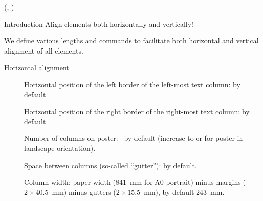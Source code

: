 \documentclass{beamer}
\newlength{\blockThree}
\begin{document}
\begin{frame}[t]
\begin{textblock*}{\colwidth}
\end{textblock*}







\TPshowboxesfalse

\begin{textblock*}{\colwidth}(\leftmargin, \blockThree)

\begin{parblock}{Introduction}
	\alert{Align elements both horizontally and vertically!}

	\vspace{0.333333\baselineskip}
	\noindent We define various lengths and commands to facilitate both horizontal and vertical alignment of all elements.

	\vspace{0.666667\baselineskip}
	\noindent\alert{Horizontal alignment}

	\begin{description}
		\item[] Horizontal position of the left border of the left-most text column: \code{40.5mm} by default.
		\item[] Horizontal position of the right border of the right-most text column: \code{40.5mm} by default.
		\item[] Number of columns on poster: ~by default (increase to  or  for poster in landscape orientation).
		\item[] Space between columns (so-called ``gutter''): \code{15.5mm} by default.
		\item[] Column width: paper width (841~mm for A0 portrait) minus margins (${2 \times 40.5}$~mm) minus gutters (${2 \times 15.5}$~mm), by default 243~mm.
	\end{description}
\end{parblock}

\end{textblock*}





\end{frame}
\end{document}
